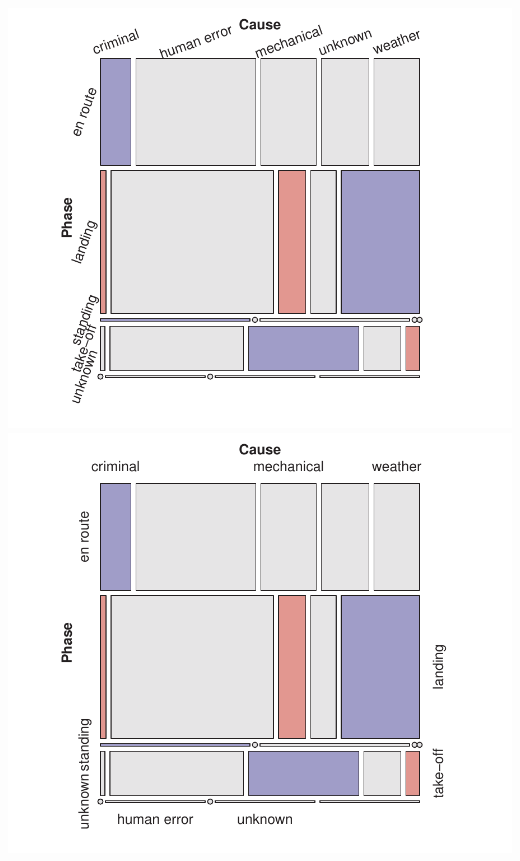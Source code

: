 \documentclass[10pt]{report}\usepackage[]{graphicx}\usepackage[]{color}
\newenvironment{knitrout}{}{} %
\renewenvironment{knitrout}{\small\renewcommand{\baselinestretch}{.85}}{} %
\begin{document}
\begin{Exercises}
\begin{enumerate*}
\begin{ans}
\begin{knitrout}
\centerline{\includegraphics[width=.5\textwidth]{soln/fig/ex5_2b-1} 
\includegraphics[width=.5\textwidth]{soln/fig/ex5_2b-2} }



\end{knitrout}
    \end{ans}
    

\end{enumerate*}
\end{Exercises}
\end{document}
